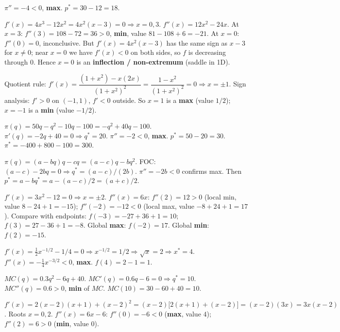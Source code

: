 \begin{solutions}
          $\pi'' = -4 < 0$, \textbf{max}. $p^* = 30 - 12 = 18$.
    \item $f'(x) = 4 x^3 - 12 x^2 = 4 x^2 (x - 3) = 0 \Rightarrow
          x = 0, 3$. $f''(x) = 12 x^2 - 24 x$. At $x = 3$:
          $f''(3) = 108 - 72 = 36 > 0$, \textbf{min}, value
          $81 - 108 + 6 = -21$. At $x = 0$: $f''(0) = 0$, inconclusive. But
          $f'(x) = 4 x^2(x - 3)$ has the same sign as $x - 3$ for
          $x \neq 0$; near $x = 0$ we have $f'(x) < 0$ on both sides, so
          $f$ is decreasing through $0$. Hence $x = 0$ is an
          \textbf{inflection / non-extremum} (saddle in 1D).
    \item Quotient rule: $f'(x) = \dfrac{(1 + x^2) - x(2 x)}{(1 + x^2)^2}
          = \dfrac{1 - x^2}{(1 + x^2)^2} = 0 \Rightarrow x = \pm 1$. Sign
          analysis: $f' > 0$ on $(-1, 1)$, $f' < 0$ outside. So $x = 1$ is
          a \textbf{max} (value $1/2$); $x = -1$ is a \textbf{min} (value
          $-1/2$).
    \item $\pi(q) = 50 q - q^2 - 10 q - 100 = -q^2 + 40 q - 100$.
          $\pi'(q) = -2 q + 40 = 0 \Rightarrow q^* = 20$. $\pi'' = -2 < 0$,
          \textbf{max}. $p^* = 50 - 20 = 30$.
          $\pi^* = -400 + 800 - 100 = 300$.
    \item $\pi(q) = (a - b q)q - c q = (a - c)q - b q^2$. FOC:
          $(a - c) - 2 b q = 0 \Rightarrow q^* = (a - c)/(2 b)$.
          $\pi'' = -2 b < 0$ confirms max. Then
          $p^* = a - b q^* = a - (a - c)/2 = (a + c)/2$.
    \item $f'(x) = 3 x^2 - 12 = 0 \Rightarrow x = \pm 2$. $f''(x) = 6 x$:
          $f''(2) = 12 > 0$ (local min, value $8 - 24 + 1 = -15$);
          $f''(-2) = -12 < 0$ (local max, value $-8 + 24 + 1 = 17$).
          Compare with endpoints: $f(-3) = -27 + 36 + 1 = 10$;
          $f(3) = 27 - 36 + 1 = -8$. Global \textbf{max}: $f(-2) = 17$.
          Global \textbf{min}: $f(2) = -15$.
    \item $f'(x) = \tfrac{1}{2} x^{-1/2} - 1/4 = 0 \Rightarrow
          x^{-1/2} = 1/2 \Rightarrow \sqrt{x} = 2 \Rightarrow x^* = 4$.
          $f''(x) = -\tfrac{1}{4} x^{-3/2} < 0$, \textbf{max}.
          $f(4) = 2 - 1 = 1$.
    \item $MC(q) = 0.3 q^2 - 6 q + 40$. $MC'(q) = 0.6 q - 6 = 0
          \Rightarrow q^* = 10$. $MC''(q) = 0.6 > 0$, \textbf{min} of $MC$.
          $MC(10) = 30 - 60 + 40 = 10$.
    \item $f'(x) = 2(x - 2)(x + 1) + (x - 2)^2 =
          (x - 2)\bigl[2(x + 1) + (x - 2)\bigr] = (x - 2)(3 x) =
          3 x (x - 2)$. Roots $x = 0, 2$. $f''(x) = 6 x - 6$:
          $f''(0) = -6 < 0$ (\textbf{max}, value $4$); $f''(2) = 6 > 0$
          (\textbf{min}, value $0$).
\end{solutions}

